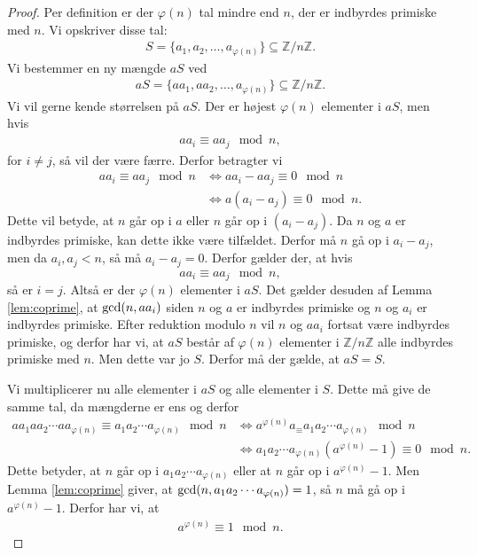 \documentclass[12pt]{article}
\begin{document}
\begin{proof}
Per definition er der $\varphi(n)$ tal mindre end $n$, der er indbyrdes primiske med $n$. Vi opskriver disse tal:
\begin{align*}
S = \{a_1,a_2,\hdots,a_{\varphi(n)}\} \subseteq \mathbb{Z}/n\mathbb{Z}. 
\end{align*}
Vi bestemmer en ny mængde $aS$ ved 
\begin{align*}
aS = \{aa_1,aa_2,\hdots, a_{\varphi(n)}\} \subseteq \mathbb{Z}/n\mathbb{Z}.
\end{align*}
Vi vil gerne kende størrelsen på $aS$. Der er højest $\varphi(n)$ elementer i $aS$, men hvis 
\begin{align*}
aa_i \equiv aa_j \mod{n}, 
\end{align*}
for $i\neq j$, så vil der være færre. Derfor betragter vi 
\begin{align*}
aa_i \equiv aa_j \mod{n} &\Leftrightarrow aa_i - aa_j \equiv 0 \mod{n}\\
 &\Leftrightarrow a(a_i-a_j) \equiv 0 \mod{n}.
\end{align*}
Dette vil betyde, at $n$ går op i $a$ eller $n$ går op i $(a_i - a_j)$. Da $n$ og $a$ er indbyrdes primiske, kan dette ikke være tilfældet. Derfor må $n$ gå op i $a_i-a_j$, men da $a_i,a_j<n$, så må $a_i-a_j = 0$. Derfor gælder der, at hvis 
\[
aa_i \equiv aa_j \mod{n},
\]
så er $i = j$. Altså er der $\varphi(n)$ elementer i $aS$. Det gælder desuden af Lemma \ref{lem:coprime}, at $\textnormal{gcd}(n,aa_i)$ siden $n$ og $a$ er indbyrdes primiske og $n$ og $a_i$ er indbyrdes primiske. Efter reduktion modulo $n$ vil $n$ og $aa_i$ fortsat være indbyrdes primiske, og derfor har vi, at $aS$ består af $\varphi(n)$ elementer i $\mathbb{Z}/n\mathbb{Z}$ alle indbyrdes primiske med $n$. Men dette var jo $S$. Derfor må der gælde, at $aS = S$. 

Vi multiplicerer nu alle elementer i $aS$ og alle elementer i $S$. Dette må give de samme tal, da mængderne er ens og derfor
\begin{align*}
aa_1aa_2\cdots aa_{\varphi(n)} \equiv a_1a_2\cdots a_{\varphi(n)} \mod{n} &\Leftrightarrow a^{\varphi(n)}a_ \equiv a_1a_2\cdots a_{\varphi(n)} \mod{n}\\
&\Leftrightarrow a_1a_2\cdots a_{\varphi(n)}( a^{\varphi(n)}-1) \equiv 0 \mod{n}.
\end{align*}
Dette betyder, at $n$ går op i $a_1a_2\cdots a_{\varphi(n)}$ eller at $n$ går op i $a^{\varphi(n)}-1$. Men Lemma \ref{lem:coprime} giver, at $\textnormal{gcd}(n,a_1a_2\cdots a_{\varphi(n)}) =1$, så $n$ må gå op i $a^{\varphi(n)}-1$. Derfor har vi, at 
\begin{align*}
a^{\varphi(n)} \equiv 1 \mod{n}.
\end{align*}
\end{proof}
\end{document}
